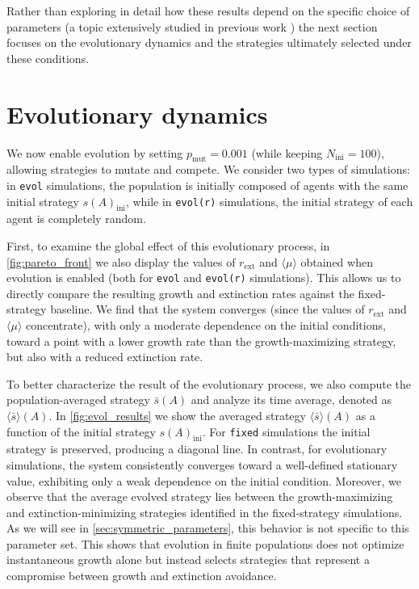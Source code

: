 \documentclass[aps,pre,reprint,10pt,superscriptaddress]{revtex4-2}
\begin{document}
Rather than exploring in detail how these results depend on the specific choice of parameters (a topic extensively studied in previous work \cite{kussellPhenotypicDiversityPopulation2005,patraEmergencePhenotypeSwitching2015,dinisParetooptimalTradeoffPhenotypic2022}) the next section focuses on the evolutionary dynamics and the strategies ultimately selected under these conditions.

\section{Evolutionary dynamics} \label{sec:evol_outcome}

We now enable evolution by setting $p_\text{mut}=0.001$ (while keeping $N_\text{ini}=100$), allowing strategies to mutate and compete. We consider two types of simulations: in \texttt{evol} simulations, the population is initially composed of agents with the same initial strategy $s(A)_\text{ini}$, while in \texttt{evol(r)} simulations, the initial strategy of each agent is completely random.

First, to examine the global effect of this evolutionary process, in \cref{fig:pareto_front} we also display the values of $r_\text{ext}$ and $\langle\mu\rangle$ obtained when evolution is enabled (both for \texttt{evol} and \texttt{evol(r)} simulations). This allows us to directly compare the resulting growth and extinction rates against the fixed-strategy baseline. We find that the system converges (since the values of $r_\text{ext}$ and $\langle\mu\rangle$ concentrate), with only a moderate dependence on the initial conditions, toward a point with a lower growth rate than the growth-maximizing strategy, but also with a reduced extinction rate.

To better characterize the result of the evolutionary process, we also compute the population-averaged strategy $\bar{s}(A)$ and analyze its time average, denoted as $\langle\bar{s}\rangle(A)$. In \cref{fig:evol_results} we show the averaged strategy $\langle\bar{s}\rangle(A)$ as a function of the initial strategy $s(A)_\text{ini}$. For \texttt{fixed} simulations the initial strategy is preserved, producing a diagonal line. In contrast, for evolutionary simulations, the system consistently converges toward a well-defined stationary value, exhibiting only a weak dependence on the initial condition. Moreover, we observe that the average evolved strategy lies between the growth-maximizing and extinction-minimizing strategies identified in the fixed-strategy simulations. As we will see in \cref{sec:symmetric_parameters}, this behavior is not specific to this parameter set. This shows that evolution in finite populations does not optimize instantaneous growth alone but instead selects strategies that represent a compromise between growth and extinction avoidance.
\end{document}
